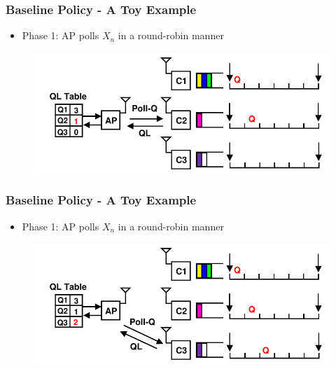 \documentclass{beamer}
\begin{document}
\begin{frame}
\frametitle{Baseline Policy - A Toy Example}
\begin{itemize}
\item Phase 1: AP polls $X_n$ in a round-robin manner
\end{itemize}
\begin{figure}
\centering
\includegraphics[scale=0.8]{animation_02.pdf}
\end{figure}
\end{frame}

\begin{frame}
\frametitle{Baseline Policy - A Toy Example}
\begin{itemize}
\item Phase 1: AP polls $X_n$ in a round-robin manner
\end{itemize}
\begin{figure}
\centering
\includegraphics[scale=0.8]{animation_03.pdf}
\end{figure}
\end{frame}
\end{document}
